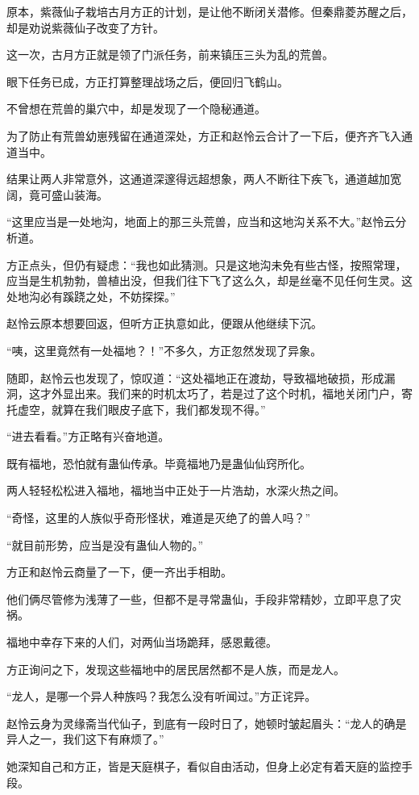 \begin{this_body}
原本，紫薇仙子栽培古月方正的计划，是让他不断闭关潜修。但秦鼎菱苏醒之后，却是劝说紫薇仙子改变了方针。

这一次，古月方正就是领了门派任务，前来镇压三头为乱的荒兽。

眼下任务已成，方正打算整理战场之后，便回归飞鹤山。

不曾想在荒兽的巢穴中，却是发现了一个隐秘通道。

为了防止有荒兽幼崽残留在通道深处，方正和赵怜云合计了一下后，便齐齐飞入通道当中。

结果让两人非常意外，这通道深邃得远超想象，两人不断往下疾飞，通道越加宽阔，竟可盛山装海。

“这里应当是一处地沟，地面上的那三头荒兽，应当和这地沟关系不大。”赵怜云分析道。

方正点头，但仍有疑虑：“我也如此猜测。只是这地沟未免有些古怪，按照常理，应当是生机勃勃，兽植出没，但我们往下飞了这么久，却是丝毫不见任何生灵。这处地沟必有蹊跷之处，不妨探探。”

赵怜云原本想要回返，但听方正执意如此，便跟从他继续下沉。

“咦，这里竟然有一处福地？！”不多久，方正忽然发现了异象。

随即，赵怜云也发现了，惊叹道：“这处福地正在渡劫，导致福地破损，形成漏洞，这才外显出来。我们来的时机太巧了，若是过了这个时机，福地关闭门户，寄托虚空，就算在我们眼皮子底下，我们都发现不得。”

“进去看看。”方正略有兴奋地道。

既有福地，恐怕就有蛊仙传承。毕竟福地乃是蛊仙仙窍所化。

两人轻轻松松进入福地，福地当中正处于一片浩劫，水深火热之间。

“奇怪，这里的人族似乎奇形怪状，难道是灭绝了的兽人吗？”

“就目前形势，应当是没有蛊仙人物的。”

方正和赵怜云商量了一下，便一齐出手相助。

他们俩尽管修为浅薄了一些，但都不是寻常蛊仙，手段非常精妙，立即平息了灾祸。

福地中幸存下来的人们，对两仙当场跪拜，感恩戴德。

方正询问之下，发现这些福地中的居民居然都不是人族，而是龙人。

“龙人，是哪一个异人种族吗？我怎么没有听闻过。”方正诧异。

赵怜云身为灵缘斋当代仙子，到底有一段时日了，她顿时皱起眉头：“龙人的确是异人之一，我们这下有麻烦了。”

她深知自己和方正，皆是天庭棋子，看似自由活动，但身上必定有着天庭的监控手段。


\end{this_body}
